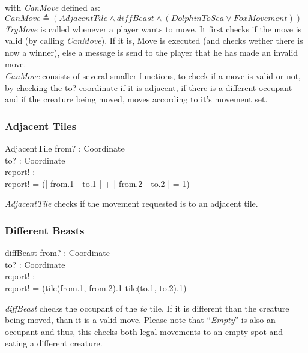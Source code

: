 \documentclass[a4paper,twoside,11pt]{book}
\begin{document}
with \emph{CanMove} defined as: \\
$CanMove \triangleq (AdjacentTile \wedge diffBeast \wedge (DolphinToSea \vee FoxMovement))$ \\

\emph{TryMove} is called whenever a player wants to move. It first checks if the move is valid (by calling \emph{CanMove}). If it is, Move is executed (and checks wether there is now a winner), else a message is send to the player that he has made an invalid move.\\

\emph{CanMove} consists of several smaller functions, to check if a move is valid or not, by checking the to? coordinate if it is adjacent, if there is a different occupant and if the creature being moved, moves according to it's movement set.

\subsubsection{Adjacent Tiles} %
\label{ssub:adjacent_tiles}
\begin{schema}{AdjacentTile}
    from? : Coordinate \\
    to? : Coordinate \\
    report! :  \\
    \ST
    report! = (| from.1 - to.1 | + | from.2 - to.2 | = 1) \\
\end{schema}
\emph{AdjacentTile} checks if the movement requested is to an adjacent tile.


\subsubsection{Different Beasts} %
\label{ssub:different_beasts}
\begin{schema}{diffBeast}
    from? : Coordinate \\
    to? : Coordinate \\
    report! :  \\
    \ST
    report! = (tile(from.1, from.2).1 \neq tile(to.1, to.2).1)
\end{schema}
\emph{diffBeast} checks the occupant of the \emph{to} tile. If it is different than the creature being moved, than it is a valid move. Please note that ``\emph{Empty}'' is also an occupant and thus, this checks both legal movements to an empty spot and eating a different creature.
\end{document}
